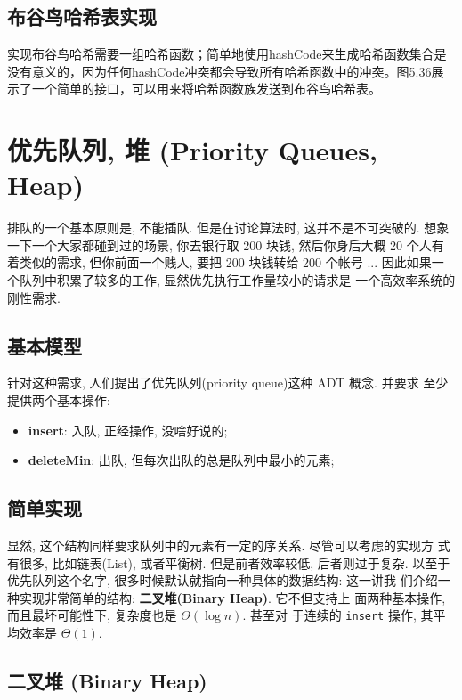 \documentclass[a4paper]{ctexart}
\theoremstyle{definition}
\theoremstyle{definition}
\begin{document}
\subsection*{布谷鸟哈希表实现}

实现布谷鸟哈希需要一组哈希函数；简单地使用hashCode来生成哈希函数集合是没有意义的，因为任何hashCode冲突都会导致所有哈希函数中的冲突。图5.36展示了一个简单的接口，可以用来将哈希函数族发送到布谷鸟哈希表。


\section{优先队列, 堆 (Priority Queues, Heap)}
排队的一个基本原则是, 不能插队. 但是在讨论算法时, 这并不是不可突破的.
想象一下一个大家都碰到过的场景, 你去银行取 200 块钱, 然后你身后大概 20
个人有着类似的需求, 但你前面一个贱人, 要把 200 块钱转给 200 个帐号
... 因此如果一个队列中积累了较多的工作, 显然优先执行工作量较小的请求是
一个高效率系统的刚性需求.

\subsection{基本模型}

针对这种需求, 人们提出了优先队列(priority queue)这种 ADT 概念. 并要求
至少提供两个基本操作:

\begin{itemize}
\item {\bf insert}: 入队, 正经操作, 没啥好说的;
\item {\bf deleteMin}: 出队, 但每次出队的总是队列中最小的元素; 
\end{itemize}

\subsection{简单实现}

显然, 这个结构同样要求队列中的元素有一定的序关系. 尽管可以考虑的实现方
式有很多, 比如链表(List), 或者平衡树. 但是前者效率较低, 后者则过于复杂.
以至于优先队列这个名字, 很多时候默认就指向一种具体的数据结构: 这一讲我
们介绍一种实现非常简单的结构: {\bf 二叉堆(Binary Heap)}.  它不但支持上
面两种基本操作, 而且最坏可能性下, 复杂度也是 $\Theta(\log n)$. 甚至对
于连续的 \verb|insert| 操作, 其平均效率是 $\Theta(1)$.

\subsection{二叉堆 (Binary Heap)}
\end{document}
